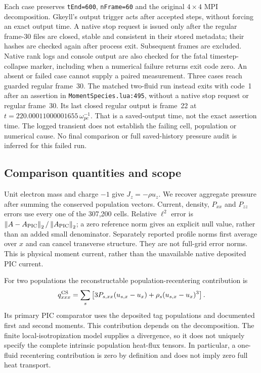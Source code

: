 Each case preserves \texttt{tEnd=600}, \texttt{nFrame=60} and the original
$4\times4$ MPI decomposition. Gkeyll's output trigger acts after accepted
steps, without forcing an exact output time. A native stop request is issued
only after the regular frame-30 files are closed, stable and consistent in
their stored metadata; their hashes are checked again after process exit.
Subsequent frames are excluded. Native rank logs and console output are
also checked for the fatal timestep-collapse marker, including when a
numerical failure returns exit code zero. An absent or failed case cannot
supply a paired measurement. Three cases reach guarded regular frame~30.
The matched two-fluid run instead exits with code~1 after an assertion in
\texttt{MomentSpecies.lua:495}, without a native stop request or regular
frame~30. Its last closed regular output is frame~22 at
$t=220.00011000001655\,\omega_{pe}^{-1}$. That is a saved-output time, not
the exact assertion time. The logged transient does not establish the
failing cell, population or numerical cause. No final comparison or full
saved-history pressure audit is inferred for this failed run.

\subsection{Comparison quantities and scope}
Unit electron mass and charge $-1$ give $J_z=-\rho u_z$. We recover aggregate
pressure after summing the conserved population vectors. Current, density,
$P_{xx}$ and $P_{zz}$ errors use every one of the 307,200 cells. Relative
$\ell^2$ error is $\left\lVert A-A_{\rm PIC}\right\rVert_2/\left\lVert A_{\rm PIC}\right\rVert_2$; a zero
reference norm gives an explicit null value, rather than an added small
denominator. Separately reported profile norms first average over $x$ and
can cancel transverse structure. They are not full-grid error norms.
This is physical moment current, rather than the unavailable native
deposited PIC current.

For two populations the reconstructable population-recentering contribution is
\[
q^{\rm CS}_{xxx}=\sum_s\left[3P_{s,xx}(u_{s,x}-u_x)
                 +\rho_s(u_{s,x}-u_x)^3\right].
\]
Its primary PIC comparator uses the deposited tag populations and documented
first and second moments. This contribution depends on the decomposition.
The finite local-isotropization model supplies a divergence, so it does not
uniquely specify the complete intrinsic population heat-flux tensors. In
particular, a one-fluid recentering contribution is zero by definition and
does not imply zero full heat transport.

